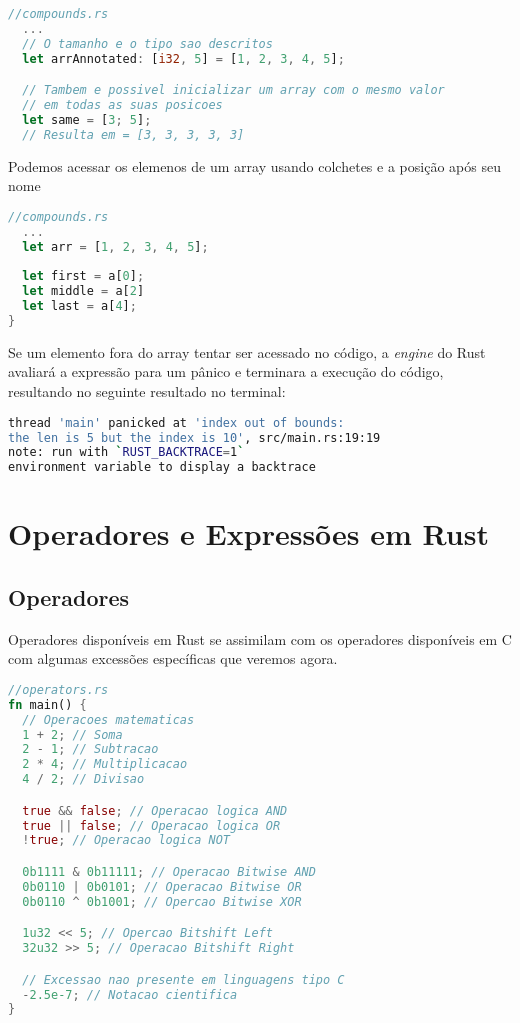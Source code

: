 \begin{lstlisting}[language=rust]
//compounds.rs
  ...
  // O tamanho e o tipo sao descritos
  let arrAnnotated: [i32, 5] = [1, 2, 3, 4, 5];

  // Tambem e possivel inicializar um array com o mesmo valor
  // em todas as suas posicoes
  let same = [3; 5];
  // Resulta em = [3, 3, 3, 3, 3]
\end{lstlisting}

Podemos acessar os elemenos de um array usando colchetes e a posição após seu nome

\begin{lstlisting}[language=rust]
//compounds.rs
  ...
  let arr = [1, 2, 3, 4, 5];
  
  let first = a[0];
  let middle = a[2]
  let last = a[4];
}
\end{lstlisting}

Se um elemento fora do array tentar ser acessado no código, a \textit{engine} do Rust avaliará a expressão para um pânico e terminara a execução do código, resultando no seguinte resultado no terminal:

\begin{lstlisting}[language=bash]
thread 'main' panicked at 'index out of bounds: 
the len is 5 but the index is 10', src/main.rs:19:19
note: run with `RUST_BACKTRACE=1` 
environment variable to display a backtrace
\end{lstlisting}

\pagebreak
\newpage

\section{Operadores e Express\~{o}es em Rust}

\subsection{Operadores}

Operadores disponíveis em Rust se assimilam com os operadores disponíveis em C com algumas excessões específicas que veremos agora.

\begin{lstlisting}[language=rust]
//operators.rs
fn main() {
  // Operacoes matematicas
  1 + 2; // Soma
  2 - 1; // Subtracao
  2 * 4; // Multiplicacao
  4 / 2; // Divisao

  true && false; // Operacao logica AND
  true || false; // Operacao logica OR
  !true; // Operacao logica NOT

  0b1111 & 0b11111; // Operacao Bitwise AND
  0b0110 | 0b0101; // Operacao Bitwise OR
  0b0110 ^ 0b1001; // Opercao Bitwise XOR

  1u32 << 5; // Opercao Bitshift Left
  32u32 >> 5; // Operacao Bitshift Right

  // Excessao nao presente em linguagens tipo C
  -2.5e-7; // Notacao cientifica
}
\end{lstlisting}

